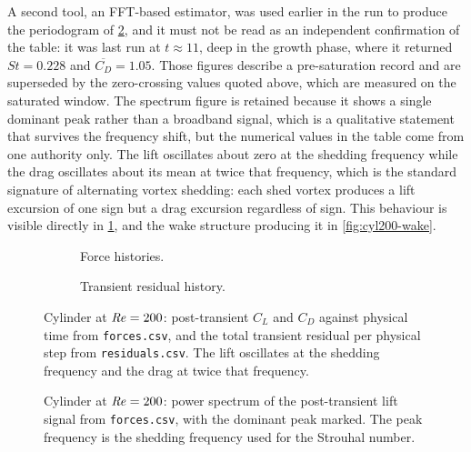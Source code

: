 A second tool, an FFT-based estimator, was used earlier in the run to produce the
periodogram of \cref{fig:cyl200-spectrum}, and it must not be read as an independent
confirmation of the table: it was last run at $t\approx11$, deep in the growth phase,
where it returned $St=0.228$ and $\overline{C_D}=1.05$. Those figures describe a
pre-saturation record and are superseded by the zero-crossing values quoted above,
which are measured on the saturated window. The spectrum figure is retained because it
shows a single dominant peak rather than a broadband signal, which is a qualitative
statement that survives the frequency shift, but the numerical values in the table
come from one authority only. The lift oscillates about zero at the shedding
frequency while the drag oscillates about its mean at twice that frequency, which
is the standard signature of alternating vortex shedding: each shed vortex
produces a lift excursion of one sign but a drag excursion regardless of sign.
This behaviour is visible directly in \cref{fig:cyl200-forces}, and the wake
structure producing it in \cref{fig:cyl200-wake}.

\begin{figure}[htbp]
  \centering
  \begin{subfigure}{0.49\textwidth}\centering
    \caption{Force histories.}
  \end{subfigure}\hfill
  \begin{subfigure}{0.49\textwidth}\centering
    \caption{Transient residual history.}
  \end{subfigure}
  \caption{Cylinder at $\mathit{Re}=200$: post-transient $C_L$ and $C_D$ against
  physical time from \texttt{forces.csv}, and the total transient residual per
  physical step from \texttt{residuals.csv}. The lift oscillates at the shedding
  frequency and the drag at twice that frequency.}
  \label{fig:cyl200-forces}
\end{figure}

\begin{figure}[htbp]
  \centering
  \caption{Cylinder at $\mathit{Re}=200$: power spectrum of the post-transient lift
  signal from \texttt{forces.csv}, with the dominant peak marked. The peak
  frequency is the shedding frequency used for the Strouhal number.}
  \label{fig:cyl200-spectrum}
\end{figure}

